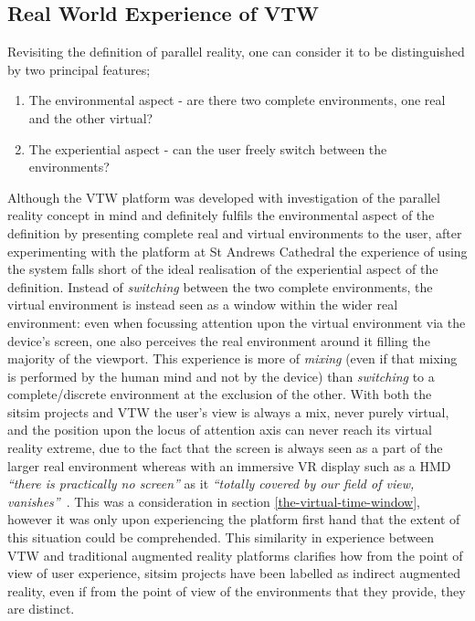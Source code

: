 
\subsection{Real World Experience of VTW}
\label{real-world-experience-of-vtw}
Revisiting the definition of parallel reality, one can consider it to be distinguished by two principal features;

\begin{enumerate}
	\item The environmental aspect - are there two complete environments, one real and the other virtual?
	\item The experiential aspect - can the user freely switch between the environments?
\end{enumerate}

Although the VTW platform was developed with investigation of the parallel reality concept in mind and definitely fulfils the environmental aspect of the definition by presenting complete real and virtual environments to the user, after experimenting with the platform at St Andrews Cathedral the experience of using the system falls short of the ideal realisation of the experiential aspect of the definition. Instead of \textit{switching} between the two complete environments, the virtual environment is instead seen as a window within the wider real environment: even when focussing attention upon the virtual environment via the device's screen, one also perceives the real environment around it filling the majority of the viewport. This experience is more of \textit{mixing} (even if that mixing is performed by the human mind and not by the device) than \textit{switching} to a complete/discrete environment at the exclusion of the other. With both the sitsim projects and VTW the user's view is always a mix, never purely virtual, and the position upon the locus of attention axis can never reach its virtual reality extreme, due to the fact that the screen is always seen as a part of the larger real environment whereas with an immersive VR display such as a HMD \textit{``there is practically no screen''} as it \textit{``totally covered by our field of view, vanishes''}~\cite{Tzortzaki2002}. This was a consideration in section \ref{the-virtual-time-window}, however it was only upon experiencing the platform first hand that the extent of this situation could be comprehended. This similarity in experience between VTW and traditional augmented reality platforms clarifies how from the point of view of user experience, sitsim projects have been labelled as indirect augmented reality, even if from the point of view of the environments that they provide, they are distinct.

